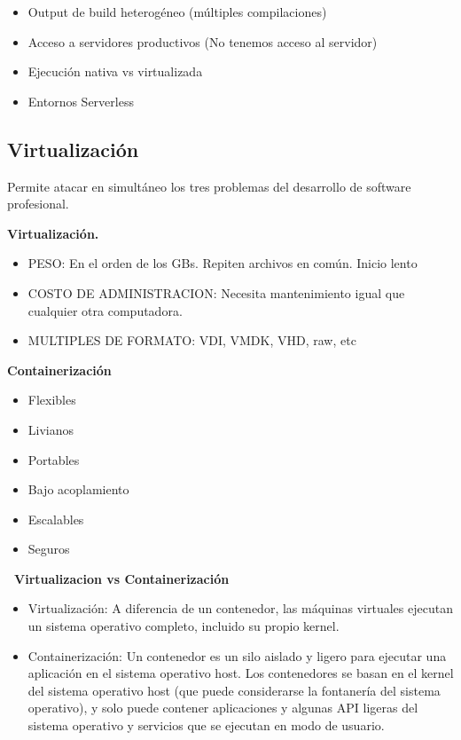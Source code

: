 \documentclass{article}
\begin{document}
\begin{itemize}
    \item Output de build heterogéneo (múltiples compilaciones)
    \item Acceso a servidores productivos (No tenemos acceso al servidor)
    \item Ejecución nativa vs virtualizada
    \item Entornos Serverless
\end{itemize}

\subsection{Virtualización}

Permite atacar en simultáneo los tres problemas del desarrollo de software profesional.\par

{\bf Virtualización.}\par
\begin{itemize}
    \item PESO: En el orden de los GBs. Repiten archivos en común. Inicio lento
    \item COSTO DE ADMINISTRACION: Necesita mantenimiento igual que cualquier otra computadora.
    \item MULTIPLES DE FORMATO: VDI, VMDK, VHD, raw, etc
\end{itemize}

{\bf Containerización}\par
\begin{itemize}
    \item Flexibles
    \item Livianos
    \item Portables
    \item Bajo acoplamiento
    \item Escalables
    \item Seguros
\end{itemize}

{\bf\ Virtualizacion vs Containerización}
\begin{itemize}
    \item Virtualización: A diferencia de un contenedor, las máquinas virtuales ejecutan un sistema operativo completo, incluido su propio kernel.
    \item Containerización: Un contenedor es un silo aislado y ligero para ejecutar una aplicación en el sistema operativo host. Los contenedores se basan en el kernel del sistema operativo host (que puede considerarse la fontanería del sistema operativo), y solo puede contener aplicaciones y algunas API ligeras del sistema operativo y servicios que se ejecutan en modo de usuario.
\end{itemize}
\end{document}
